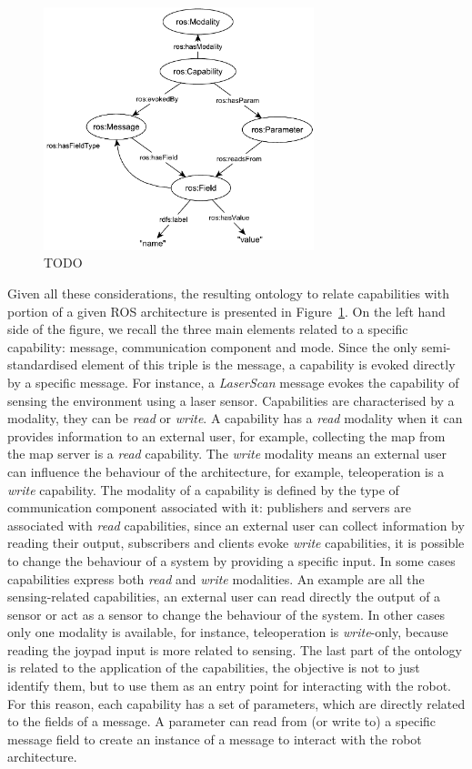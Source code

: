 \begin{figure}[t]
\centering
\includegraphics[width=0.70\textwidth]{gfx/onto/comptocapa}
\caption{TODO}
\label{fig:onto-capa}
\end{figure}

Given all these considerations, the resulting ontology to relate capabilities with portion of a given ROS architecture is presented in Figure~\ref{fig:onto-capa}. On the left hand side of the figure, we recall the three main elements related to a specific capability: message, communication component and mode. Since the only semi-standardised element of this triple is the message, a capability is evoked directly by a specific message. For instance, a \textit{LaserScan} message evokes the capability of sensing the environment using a laser sensor. Capabilities are characterised by a modality, they can be \textit{read} or \textit{write}. A capability has a \textit{read} modality when it can provides information to an external user, for example, collecting the map from the map server is a \textit{read} capability. The \textit{write} modality means an external user can influence the behaviour of the architecture, for example, teleoperation is a \textit{write} capability. The modality of a capability is defined by the type of communication component associated with it: publishers and servers are associated with \textit{read} capabilities, since an external user can collect information by reading their output, subscribers and clients evoke \textit{write} capabilities, it is possible to change the behaviour of a system by providing a specific input. In some cases capabilities express both \textit{read} and \textit{write} modalities. An example are all the sensing-related capabilities, an external user can read directly the output of a sensor or act as a sensor to change the behaviour of the system. In other cases only one modality is available, for instance, teleoperation is \textit{write}-only, because reading the joypad input is more related to sensing. The last part of the ontology is related to the application of the capabilities, the objective is not to just identify them, but to use them as an entry point for interacting with the robot. For this reason, each capability has a set of parameters, which are directly related to the fields of a message. A parameter can read from (or write to) a specific message field to create an instance of a message to interact with the robot architecture.


